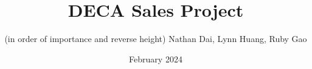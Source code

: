 \documentclass[10pt,a4paper,table,xcdraw]{article}
\begin{document}
\title{DECA Sales Project} %
\author{(in order of importance and reverse height) Nathan Dai, Lynn Huang, Ruby Gao}
\date{February 2024} %
\maketitle %

\clearpage
\setcounter{tocdepth}{4}
\tableofcontents
\clearpage








\clearpage


{}

\begin{appendices}
	
\end{appendices}
\end{document}
